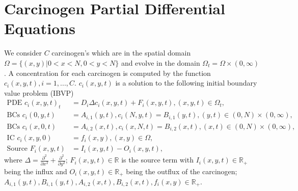 \documentclass[\main/thesis.tex]{subfiles}
\begin{document}
\section{Carcinogen Partial Differential Equations}
We consider $C$ carcinogen's which are in the spatial domain $\Omega {=} \{ (x, y) | 0 {<} x {<} N, 0 {<} y {<} N \}$ and evolve in the domain $\Omega_t {=} \Omega {\times} (0, \infty)$. A concentration for each carcinogen is computed by the function $c_i(x, y, t), i=1, ..., C$. $c_i(x, y, t)$ is a solution to the following initial boundary value problem (IBVP)
\begin{align}
\text{PDE } c_i(x, y, t)_t &{=} D_i\Delta c_i(x, y, t) {+} F_i(x, y, t), (x, y, t) {\in} \Omega_t,
\label{eq:carcin_pde_inhomo} \\
\text{BCs } c_i(0, y, t) &{=} A_{i, 1}(y, t), c_i(N, y, t) {=} B_{i, 1}(y, t), (y, t) {\in} (0, N) {\times} (0, \infty),
\label{eq:bcs_inhomo_x} \\
\text{BCs } c_i(x, 0, t) &{=} A_{i, 2}(x, t), c_i(x, N, t) {=} B_{i, 2}(x, t), (x, t) {\in} (0, N) {\times} (0, \infty),
\label{eq:bcs_inhomo_y} \\
\text{IC } c_i(x, y, 0) &{=} f_i(x, y), (x, y) {\in} \Omega,
\label{eq:ic_inhomo} \\
\text{Source } F_i(x, y, t) &{=} I_i(x, y, t) {-} O_i(x, y, t),
\label{eq:source_term}
\end{align}
where $\Delta {=} \frac{\partial^2}{\partial x^2} + \frac{\partial^2}{\partial y^2}$; $F_i(x, y, t) {\in} \mathbb{R}$ is the source term with $I_i(x, y, t) {\in} \mathbb{R}_+$ being the influx and $O_i(x, y, t) {\in} \mathbb{R}_+$ being the outflux of the carcinogen; \\ $A_{i, 1}(y, t), B_{i, 1}(y, t), A_{i, 2}(x, t), B_{i, 2}(x, t), f_i(x, y) {\in} \mathbb{R}_+$.  
\end{document}
